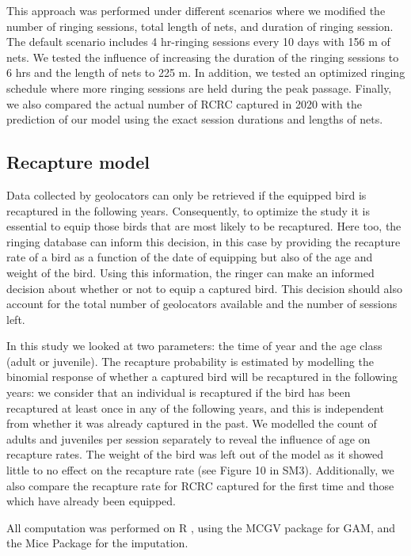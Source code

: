 \documentclass[]{interact}
\theoremstyle{plain}%
\theoremstyle{definition}
\theoremstyle{remark}
\begin{document}
This approach was performed under different scenarios where we modified
the number of ringing sessions, total length of nets, and duration of
ringing session. The default scenario includes 4 hr-ringing sessions
every 10 days with 156 m of nets. We tested the influence of increasing
the duration of the ringing sessions to 6 hrs and the length of nets to
225 m. In addition, we tested an optimized ringing schedule where more
ringing sessions are held during the peak passage. Finally, we also
compared the actual number of RCRC captured in 2020 with the prediction
of our model using the exact session durations and lengths of nets.

\hypertarget{recapture-model}{%
\subsection{Recapture model}\label{recapture-model}}

Data collected by geolocators can only be retrieved if the equipped bird
is recaptured in the following years. Consequently, to optimize the
study it is essential to equip those birds that are most likely to be
recaptured. Here too, the ringing database can inform this decision, in
this case by providing the recapture rate of a bird as a function of the
date of equipping but also of the age and weight of the bird. Using this
information, the ringer can make an informed decision about whether or
not to equip a captured bird. This decision should also account for the
total number of geolocators available and the number of sessions left.

In this study we looked at two parameters: the time of year and the age
class (adult or juvenile). The recapture probability is estimated by
modelling the binomial response of whether a captured bird will be
recaptured in the following years: we consider that an individual is
recaptured if the bird has been recaptured at least once in any of the
following years, and this is independent from whether it was already
captured in the past. We modelled the count of adults and juveniles per
session separately to reveal the influence of age on recapture rates.
The weight of the bird was left out of the model as it showed little to
no effect on the recapture rate (see Figure 10 in SM3). Additionally, we
also compare the recapture rate for RCRC captured for the first time and
those which have already been equipped.

All computation was performed on R \citep{team2013r}, using the MCGV
package \citep{wood2017generalized} for GAM, and the Mice Package
\citep{Buuren2011} for the imputation.
\end{document}
